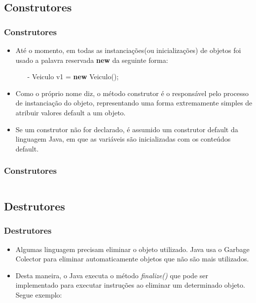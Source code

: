 \documentclass{beamer}
\begin{document}
\subsection{Construtores} %
\begin{frame}
	\frametitle{Construtores}
	\begin{itemize}
		\item Até o momento, em todas as instanciações(ou inicializações) de objetos foi usado a palavra reservada \textbf{new} da seguinte forma:
		\begin{itemize}
			\item[-] Veiculo v1 = \textbf{new} Veiculo();
 		\end{itemize}
 		\item Como o próprio nome diz, o método construtor é o responsável pelo processo de instanciação do objeto, representando uma forma extremamente simples de atribuir valores default a um objeto.
 		\item Se um construtor não for declarado, é assumido um construtor default  da linguagem Java, em que as variáveis são inicializadas com os conteúdos default. 
	\end{itemize}
\end{frame}
\begin{frame}
	\frametitle{Construtores}
	\inputminted{java}{codigos/Construtores01.java}
\end{frame}

\subsection{Destrutores}
\begin{frame}
	\frametitle{Destrutores}
	\begin{itemize}
		\item Algumas linguagem precisam eliminar o objeto utilizado. Java usa o Garbage Colector para eliminar automaticamente objetos que não são mais utilizados. 
		\item Desta maneira, o Java executa o método \textit{finalize()} que pode ser implementado para executar instruções ao eliminar um determinado objeto. Segue exemplo:
	\end{itemize}
	\inputminted{java}{codigos/Destrutores01.java}
\end{frame}	
\end{document}

